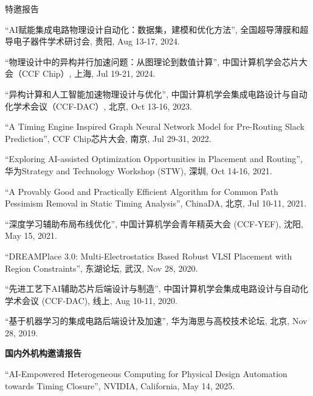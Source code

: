 \begin{rSection}{特邀报告}
\begin{description}[font=\normalfont]
\item[{[10]}]{
``AI赋能集成电路物理设计自动化：数据集，建模和优化方法'', 全国超导薄膜和超导电子器件学术研讨会, 贵阳, Aug 13-17, 2024. 
}

\item[{[9]}]{
``物理设计中的异构并行加速问题：从图理论到数值计算'', 中国计算机学会芯片大会（CCF Chip）, 上海, Jul 19-21, 2024. 
}

\item[{[8]}]{
``异构计算和人工智能加速物理设计与优化'', 中国计算机学会集成电路设计与自动化学术会议（CCF-DAC）, 北京, Oct 13-16, 2023. 
}

\item[{[7]}]{
``A Timing Engine Inspired Graph Neural Network Model for Pre-Routing Slack Prediction'', CCF Chip芯片大会, 南京, Jul 29-31, 2022. 
}

\item[{[6]}]{
``Exploring AI-assisted Optimization Opportunities in Placement and Routing'', 华为Strategy and Technology Workshop (STW), 深圳, Oct 14-16, 2021. 
}

\item[{[5]}]{
``A Provably Good and Practically Efficient Algorithm for Common Path Pessimism Removal in Static Timing Analysis'', ChinaDA, 北京, Jul 10-11, 2021. 
}

\item[{[4]}]{
``深度学习辅助布局布线优化'', 中国计算机学会青年精英大会 (CCF-YEF), 沈阳, May 15, 2021. 
}

\item[{[3]}]{
``DREAMPlace 3.0: Multi-Electrostatics Based Robust VLSI Placement with Region Constraints'', 东湖论坛, 武汉, Nov 28, 2020.
}

\item[{[2]}]{
``先进工艺下AI辅助芯片后端设计与制造'', 中国计算机学会集成电路设计与自动化学术会议 (CCF-DAC), 线上, Aug 10-11, 2020. 
}

\item[{[1]}]{
``基于机器学习的集成电路后端设计及加速'', 华为海思与高校技术论坛, 北京, Nov 28, 2019. 
}

\end{description}

\textbf{国内外机构邀请报告}
        
\begin{description}[font=\normalfont]

\item[{[15]}]{
``AI-Empowered Heterogeneous Computing for Physical Design Automation towards Timing Closure'', NVIDIA, California, May 14, 2025. 
}


\end{description}
\end{rSection}
